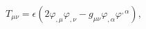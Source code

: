 \begin{equation}
  \label{eq:emtensor}
  T_{\mu \nu} = \epsilon(2 \varphi_{,\mu} \varphi_{,\nu} - g_{\mu\nu}
  \varphi_{,\alpha}\varphi^{,\alpha}) ,
\end{equation}

